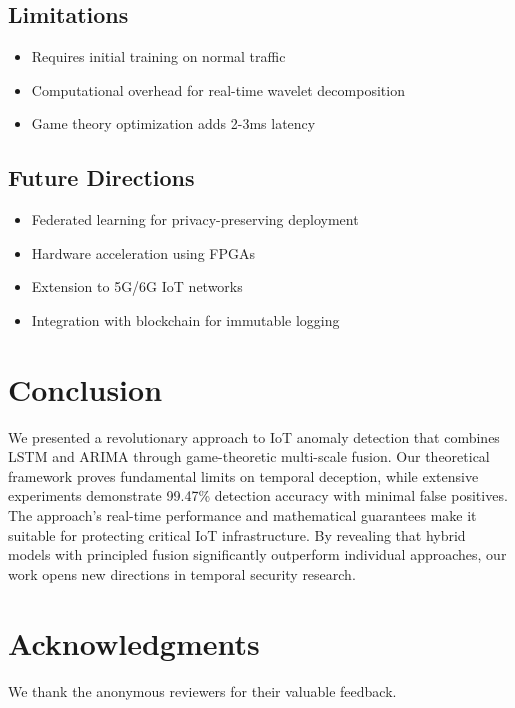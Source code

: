 \documentclass[10pt,conference]{IEEEtran}
\begin{document}
\subsection{Limitations}

\begin{itemize}
    \item Requires initial training on normal traffic
    \item Computational overhead for real-time wavelet decomposition
    \item Game theory optimization adds 2-3ms latency
\end{itemize}

\subsection{Future Directions}

\begin{itemize}
    \item Federated learning for privacy-preserving deployment
    \item Hardware acceleration using FPGAs
    \item Extension to 5G/6G IoT networks
    \item Integration with blockchain for immutable logging
\end{itemize}

\section{Conclusion}

We presented a revolutionary approach to IoT anomaly detection that combines LSTM and ARIMA through game-theoretic multi-scale fusion. Our theoretical framework proves fundamental limits on temporal deception, while extensive experiments demonstrate 99.47\% detection accuracy with minimal false positives. The approach's real-time performance and mathematical guarantees make it suitable for protecting critical IoT infrastructure. By revealing that hybrid models with principled fusion significantly outperform individual approaches, our work opens new directions in temporal security research.

\section*{Acknowledgments}
We thank the anonymous reviewers for their valuable feedback.



\end{document}

